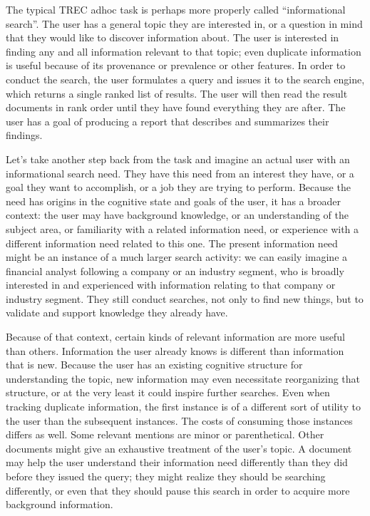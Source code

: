 \documentclass[nobib]{tufte-book}
\begin{document}
The typical TREC adhoc task is perhaps more properly called ``informational search''.  The user has a general topic they are interested in, or a question in mind that they would like to discover information about.  The user is interested in finding any and all information relevant to that topic; even duplicate information is useful because of its provenance or prevalence or other features.  In order to conduct the search, the user formulates a query and issues it to the search engine, which returns a single ranked list of results.  The user will then read the result documents in rank order until they have found everything they are after.  The user has a goal of producing a report that describes and summarizes their findings.

Let's take another step back from the task and imagine an actual user with an informational search need.  They have this need from an interest they have, or a goal they want to accomplish, or a job they are trying to perform.  Because the need has origins in the cognitive state and goals of the user, it has a broader context: the user may have background knowledge, or an understanding of the subject area, or familiarity with a related information need, or experience with a different information need related to this one.  The present information need might be an instance of a much larger search activity: we can easily imagine a financial analyst following a company or an industry segment, who is broadly interested in and experienced with information relating to that company or industry segment.  They still conduct searches, not only to find new things, but to validate and support knowledge they already have.

Because of that context, certain kinds of relevant information are more useful than others.  Information the user already knows is different than information that is new.  Because the user has an existing cognitive structure for understanding the topic, new information may even necessitate reorganizing that structure, or at the very least it could inspire further searches. Even when tracking duplicate information, the first instance is of a different sort of utility to the user than the subsequent instances.  The costs of consuming those instances differs as well.  Some relevant mentions are minor or parenthetical.  Other documents might give an exhaustive treatment of the user's topic.  A document may help the user understand their information need differently than they did before they issued the query; they might realize they should be searching differently, or even that they should pause this search in order to acquire more background information.
\end{document}
